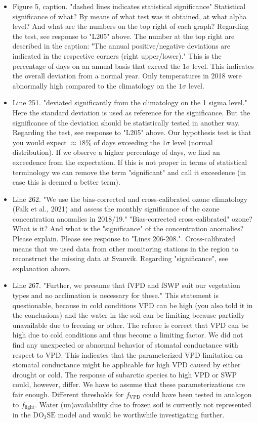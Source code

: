 \documentclass{scrartcl}
\begin{document}
\begin{itemize}
\item {\color{blue}Figure 5, caption. "dashed lines indicates statistical significance" Statistical significance of what? By means of what test was it obtained, at what alpha level? And what are the numbers on the top right of each graph?}
Regarding the test, see response to "L205" above. The number at the top right are described in the caption: "The annual positive/negative deviations are indicated in the respective corners (right upper/lower)." This is the percentage of days on an annual basis that exceed the $1\sigma$ level. This indicates the overall deviation from a normal year. Only temperatures in 2018 were abnormally high compared to the climatology on the $1\sigma$ level.

\item {\color{blue}Line 251. "deviated significantly from the climatology on the 1 sigma level." Here the standard deviation is used as reference for the significance. But the significance of the deviation should be statistically tested in another way.}
Regarding the test, see response to "L205" above. Our hypothesis test is that you would expect $\approx18\%$ of days exceeding the $1\sigma$ level (normal distribution). If we observe a higher percentage of days, we find an exceedence from the expectation. If this is not proper in terms of statistical terminology we can remove the term "significant" and call it exceedence (in case this is deemed a better term).

\item {\color{blue}Line 262. "We use the bias-corrected and cross-calibrated ozone climatology (Falk et al., 2021) and assess the monthly significance of the ozone concentration anomalies in 2018/19." 
"Bias-corrected cross-calibrated" ozone? What is it? And what is the "significance" of the concentration anomalies? Please explain.}
Please see response to "Lines 206-208.". Cross-calibrated means that we used data from other monitoring stations in the region to reconstruct the missing data at Svanvik. Regarding "significance", see explanation above.

\item {\color{blue}Line 267. "Further, we presume that fVPD and fSWP suit our vegetation types and no acclimation is necessary for these." This statement is questionable, because in cold conditions VPD can be high (you also told
it in the conclusions) and the water in the soil can be limiting because partially unavailable due to freezing or other.}
The referee is correct that VPD can be high due to cold conditions and thus become a limiting factor. We did not find any unexpected or abnormal behavior of stomatal conductance with respect to VPD. This indicates that the parameterized VPD limitation on stomatal conductance might be applicable for high VPD caused by either drought or cold. The response of subarctic species to high VPD or SWP could, however, differ. We have to assume that these parameterizations are fair enough. Different thresholds for $f_\mathrm{VPD}$ could have been tested in analogon to $f_\mathrm{light}$. Water (un)availability due to frozen soil is currently not represented in the $\mathrm{DO_3SE}$ model and would be worthwhile investigating further.


\end{itemize}
\end{document}
